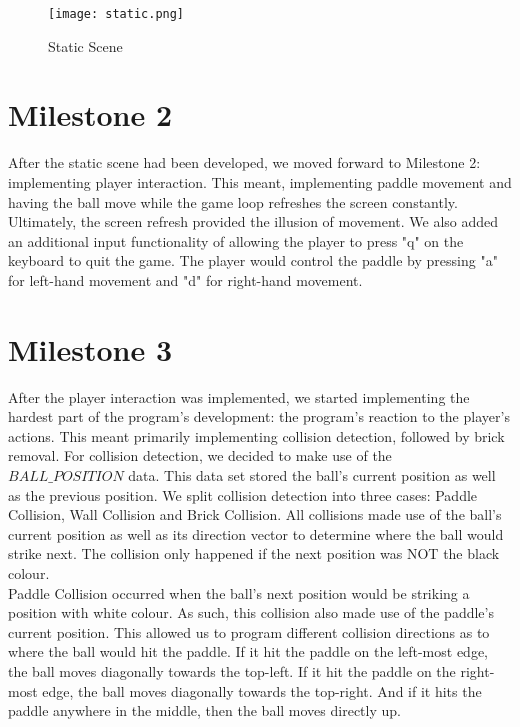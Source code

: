 \documentclass{article}
\begin{document}
\begin{figure}[ht!]
    \centering
    \texttt{[image: static.png]}
    \caption{Static Scene}
    \label{f:counter2}
\end{figure}


\section{Milestone 2}
After the static scene had been developed, we moved forward to Milestone 2: implementing player interaction. This meant, implementing paddle movement and having the ball move while the game loop refreshes the screen constantly. Ultimately, the screen refresh provided the illusion of movement. We also added an additional input functionality of allowing the player to press "q" on the keyboard to quit the game. The player would control the paddle by pressing "a" for left-hand movement and "d" for right-hand movement.

\section{Milestone 3}
After the player interaction was implemented, we started implementing the hardest part of the program's development: the program's reaction to the player's actions. This meant primarily implementing collision detection, followed by brick removal. For collision detection, we decided to make use of the $BALL\_POSITION$ data. This data set stored the ball's current position as well as the previous position. We split collision detection into three cases: Paddle Collision, Wall Collision and Brick Collision. All collisions made use of the ball's current position as well as its direction vector to determine where the ball would strike next. The collision only happened if the next position was NOT the black colour. \\

Paddle Collision occurred when the ball's next position would be striking a position with white colour. As such, this collision also made use of the paddle's current position. This allowed us to program different collision directions as to where the ball would hit the paddle. If it hit the paddle on the left-most edge, the ball moves diagonally towards the top-left. If it hit the paddle on the right-most edge, the ball moves diagonally towards the top-right. And if it hits the paddle anywhere in the middle, then the ball moves directly up. \\
\end{document}
